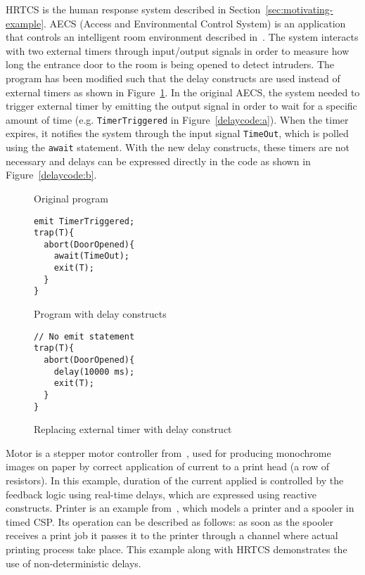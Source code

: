 HRTCS is the human response system described in
Section~\ref{sec:motivating-example}. AECS (Access and Environmental
Control System) is an application that controls an intelligent room
environment described in~\cite{aecs_ispa}. The system interacts with two
external timers through input/output signals in order to measure how
long the entrance door to the room is being opened to detect intruders.
The program has been modified such that the delay constructs are used
instead of external timers as shown in Figure~\ref{delaycode}. In the
original AECS, the system needed to trigger external timer by emitting
the output signal in order to wait for a specific amount of time (e.g.
\texttt{TimerTriggered} in Figure~\ref{delaycode:a}). When the timer
expires, it notifies the system through the input signal
\texttt{TimeOut}, which is polled using the \texttt{await}
statement. With the new delay constructs, these timers are not necessary
and delays can be expressed directly in the code as shown in
Figure~\ref{delaycode:b}.

\begin{figure}[h!]
  \begin{SubFloat}{\label{delaycode:a}Original program}
    \centering
    \begin{minipage}[b]{0.3\linewidth}
      \scriptsize
\begin{verbatim}
emit TimerTriggered;
trap(T){
  abort(DoorOpened){
    await(TimeOut);
    exit(T); 
  }
}
\end{verbatim}
    \end{minipage}
  \end{SubFloat}
  \hspace{1cm}%
  \begin{SubFloat}{\label{delaycode:b}Program with delay constructs}
    \centering
    \begin{minipage}[b]{0.5\linewidth}
      \scriptsize
\begin{verbatim}
// No emit statement
trap(T){
  abort(DoorOpened){
    delay(10000 ms);
    exit(T);  
  }
}
\end{verbatim}
		\end{minipage}
	\end{SubFloat}
\caption{Replacing external timer with delay construct}
\label{delaycode}
\end{figure}

Motor is a stepper motor controller from~\cite{Bourke2009a}, used for
producing monochrome images on paper by correct application of current
to a print head (a row of resistors). In this example, duration of the
current applied is controlled by the feedback logic using real-time
delays, which are expressed using reactive constructs. Printer is an
example from~\cite{Schneider:1999:CRT:555233}, which models a printer
and a spooler in timed CSP. Its operation can be described as follows:
as soon as the spooler receives a print job it passes it to the printer
through a channel where actual printing process take place. This example
along with HRTCS demonstrates the use of non-deterministic delays.

